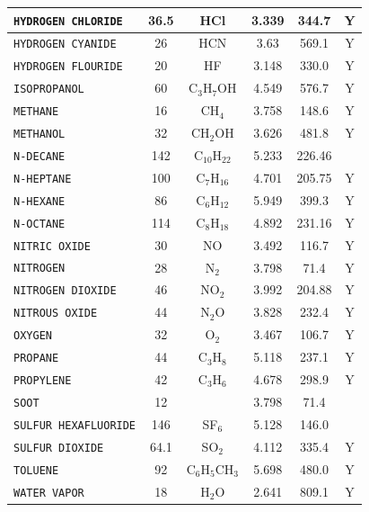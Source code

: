 \documentclass[11pt]{book}
\newcommand{\ct}{\tt\small}
\begin{document}
\begin{table}[ht]
\begin{center}
\begin{tabular}{|l|c|c|c|c|c|}
{\ct HYDROGEN CHLORIDE}  & 36.5 & HCl              & 3.339    & 344.7           &    Y   \\ \hline
{\ct HYDROGEN CYANIDE}   & 26   & HCN              & 3.63     & 569.1           &    Y   \\ \hline
{\ct HYDROGEN FLOURIDE}  & 20   & HF               & 3.148    & 330.0           &    Y   \\ \hline
{\ct ISOPROPANOL}        & 60   & C$_3$H$_7$OH     & 4.549    & 576.7           &    Y   \\ \hline
{\ct METHANE}            & 16   & CH$_4$           & 3.758    & 148.6           &    Y   \\ \hline
{\ct METHANOL}           & 32   & CH$_2$OH         & 3.626    & 481.8           &    Y   \\ \hline
{\ct N-DECANE}           & 142  & C$_{10}$H$_{22}$ & 5.233    & 226.46          &        \\ \hline
{\ct N-HEPTANE}          & 100  & C$_7$H$_{16}$    & 4.701    & 205.75          &    Y   \\ \hline
{\ct N-HEXANE}           & 86   & C$_6$H$_{12}$    & 5.949    & 399.3           &    Y   \\ \hline
{\ct N-OCTANE}           & 114  & C$_8$H$_{18}$    & 4.892    & 231.16          &    Y   \\ \hline
{\ct NITRIC OXIDE}       & 30   & NO               & 3.492    & 116.7           &    Y   \\ \hline
{\ct NITROGEN}           & 28   & N$_2$            & 3.798    & 71.4            &    Y   \\ \hline
{\ct NITROGEN DIOXIDE}   & 46   & NO$_2$           & 3.992    & 204.88          &    Y   \\ \hline
{\ct NITROUS OXIDE}      & 44   & N$_2$O           & 3.828    & 232.4           &    Y   \\ \hline
{\ct OXYGEN}             & 32   & O$_2$            & 3.467    & 106.7           &    Y   \\ \hline
{\ct PROPANE}            & 44   & C$_3$H$_8$       & 5.118    & 237.1           &    Y   \\ \hline
{\ct PROPYLENE}          & 42   & C$_3$H$_6$       & 4.678    & 298.9           &    Y   \\ \hline
{\ct SOOT}               & 12   &                  & 3.798    & 71.4            &        \\ \hline
{\ct SULFUR HEXAFLUORIDE}& 146  & SF$_6$           & 5.128    & 146.0           &        \\ \hline
{\ct SULFUR DIOXIDE}     & 64.1 & SO$_2$           & 4.112    & 335.4           &    Y   \\ \hline
{\ct TOLUENE}            & 92   & C$_6$H$_5$CH$_3$ & 5.698    & 480.0           &    Y   \\ \hline
{\ct WATER VAPOR}        & 18   & H$_2$O           & 2.641    & 809.1           &    Y   \\ \hline
\end{tabular}
\end{center}
\end{table}
\end{document}
